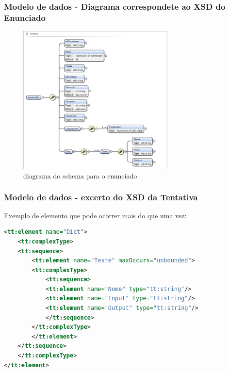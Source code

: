 \documentclass{beamer}
\begin{document}
\begin{frame}[fragile] \frametitle{Modelo de dados - Diagrama correspondete ao XSD do Enunciado}
\begin{figure}[htbp]
\begin{center}
\includegraphics[width=0.7\textwidth]{../report1/Images/enunciado_schema}
\caption{diagrama do schema para o enunciado}\label{fig xsd enunciado}
\end{center}
\end{figure}
\end{frame}


\begin{frame}[fragile] \frametitle{Modelo de dados - excerto do XSD da Tentativa}
Exemplo de elemento que pode ocorrer mais do que uma vez:\\
\begin{lstlisting}[language=XML,basicstyle=\tiny,breaklines=true]
<tt:element name="Dict">
    <tt:complexType>
    <tt:sequence>
        <tt:element name="Teste" maxOccurs="unbounded">
        <tt:complexType>
            <tt:sequence>
            <tt:element name="Nome" type="tt:string"/>
            <tt:element name="Input" type="tt:string"/>
            <tt:element name="Output" type="tt:string"/>
            </tt:sequence>
        </tt:complexType>
        </tt:element>
    </tt:sequence>
    </tt:complexType>
</tt:element>
\end{lstlisting}
\end{frame}
\end{document}
